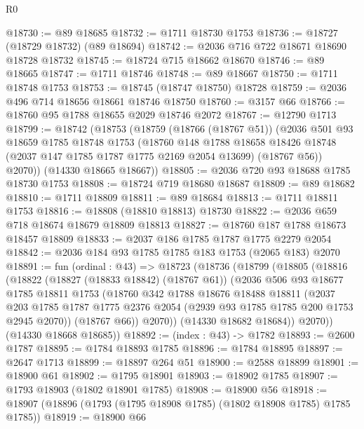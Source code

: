 \begin{lexlean}{R0}
\begin{coremodule}
@18730 := @89 @18685
@18732 := @1711 @18730 @1753
@18736 := @18727 (@18729 @18732) (@89 @18694)
@18742 := @2036 @716 @722 @18671 @18690 @18728 @18732
@18745 := @18724 @715 @18662 @18670
@18746 := @89 @18665
@18747 := @1711 @18746
@18748 := @89 @18667
@18750 := @1711 @18748 @1753
@18753 := @18745 (@18747 @18750) @18728
@18759 := @2036 @496 @714 @18656 @18661 @18746 @18750
@18760 := @3157 @66
@18766 := @18760 @95 @1788 @18655 @2029 @18746 @2072
@18767 := @12790 @1713
@18799 := @18742
    (@18753
      (@18759
        (@18766 (@18767 @51))
        (@2036
          @501
          @93
          @18659
          @1785
          @18748
          @1753
          (@18760
            @148
            @1788
            @18658
            @18426
            @18748
            (@2037 @147 @1785 @1787 @1775 @2169 @2054 @13699)
            (@18767 @56))
          @2070))
      (@14330 @18665 @18667))
@18805 := @2036 @720 @93 @18688 @1785 @18730 @1753
@18808 := @18724 @719 @18680 @18687
@18809 := @89 @18682
@18810 := @1711 @18809
@18811 := @89 @18684
@18813 := @1711 @18811 @1753
@18816 := @18808 (@18810 @18813) @18730
@18822 := @2036 @659 @718 @18674 @18679 @18809 @18813
@18827 := @18760 @187 @1788 @18673 @18457 @18809
@18833 := @2037 @186 @1785 @1787 @1775 @2279 @2054
@18842 := @2036 @184 @93 @1785 @1785 @183 @1753 (@2065 @183) @2070
@18891 := fun (ordinal : @43) =>
  @18723
    (@18736
      (@18799
        (@18805
          (@18816
            (@18822
              (@18827 (@18833 @18842) (@18767 @61))
              (@2036
                @506
                @93
                @18677
                @1785
                @18811
                @1753
                (@18760
                  @342
                  @1788
                  @18676
                  @18488
                  @18811
                  (@2037
                    @203
                    @1785
                    @1787
                    @1775
                    @2376
                    @2054
                    (@2939 @93 @1785 @1785 @200 @1753 @2945 @2070))
                  (@18767 @66))
                @2070))
            (@14330 @18682 @18684))
          @2070))
      (@14330 @18668 @18685))
@18892 := (index : @43) -> @1782
@18893 := @2600 @1787
@18895 := @1784 @18893 @1785
@18896 := @1784 @18895
@18897 := @2647 @1713
@18899 := @18897 @264 @51
@18900 := @2588 @18899
@18901 := @18900 @61
@18902 := @1795 @18901
@18903 := @18902 @1785
@18907 := @1793 @18903 (@1802 @18901 @1785)
@18908 := @18900 @56
@18918 := @18907 (@18896 (@1793 (@1795 @18908 @1785) (@1802 @18908 @1785) @1785 @1785))
@18919 := @18900 @66

\end{coremodule}
\end{lexlean}
